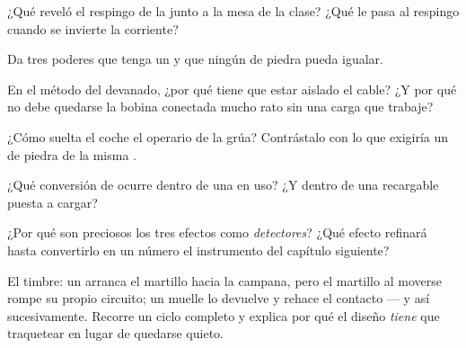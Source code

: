 \begin{exercise}[$\star$]\label{exo:g8:electric-current-effects:3}
¿Qué reveló el respingo de la  junto a la mesa de la clase?
¿Qué le pasa al respingo cuando se invierte la corriente?
\end{exercise}

\begin{exercise}[$\star$]\label{exo:g8:electric-current-effects:4}
Da tres poderes que tenga un  y que ningún 
de piedra pueda igualar.
\end{exercise}

\begin{exercise}[$\star$]\label{exo:g8:electric-current-effects:5}
En el método del devanado, ¿por qué tiene que estar aislado el cable?
¿Y por qué no debe quedarse la bobina conectada mucho rato sin una
carga que trabaje?
\end{exercise}

\begin{exercise}[$\star$]\label{exo:g8:electric-current-effects:6}
¿Cómo suelta el coche el operario de la grúa? Contrástalo con lo que
exigiría un  de piedra de la misma .
\end{exercise}

\begin{exercise}[$\star$]\label{exo:g8:electric-current-effects:7}
¿Qué conversión de  ocurre dentro de una  en uso?
¿Y dentro de una  recargable puesta a cargar?
\end{exercise}

\begin{exercise}[$\star$]\label{exo:g8:electric-current-effects:8}
¿Por qué son preciosos los tres efectos como \emph{detectores}? ¿Qué
efecto refinará hasta convertirlo en un número el instrumento del
capítulo siguiente?
\end{exercise}

\begin{exercise}[$\star\star$]\label{exo:g8:electric-current-effects:9}
El timbre: un  arranca el martillo hacia la campana,
pero el martillo al moverse rompe su propio circuito; un muelle lo
devuelve y rehace el contacto --- y así sucesivamente. Recorre un
ciclo completo y explica por qué el diseño \emph{tiene} que traquetear
en lugar de quedarse quieto.
\end{exercise}

